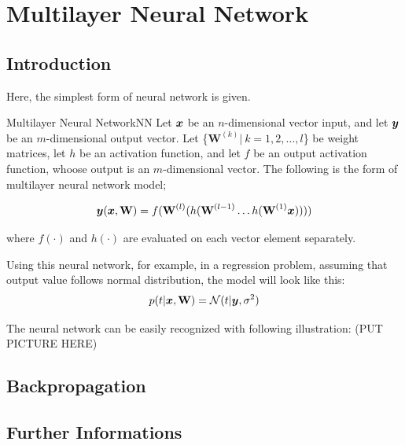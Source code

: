 \documentclass{report}
\begin{document}
    \section{Multilayer Neural Network}
    
        \subsection{Introduction}
        Here, the simplest form of neural network is given.

        \begin{defn}{Multilayer Neural Network}{NN}
            Let $\boldsymbol{x}$ be an $n$-dimensional vector input, and let $\boldsymbol{y}$ be an $m$-dimensional output vector.
            Let \{$\textbf{W}^{(k)}|\ k=1,2,\ldots,l$\} be weight matrices, let $h$ be an activation function,
            and let $f$ be an output activation function, whoose output is an $m$-dimensional vector.
            The following is the form of multilayer neural network model;

            \[
            \boldsymbol{y}(\boldsymbol{x},\textbf{W})=f(\textbf W^{(l)}(h(\textbf W^{(l-1)}\ldots h(\textbf W^{(1)}\boldsymbol{x}))))
            \]

            where $f(\cdot)$ and $h(\cdot)$ are evaluated on each vector element separately.
        
        \end{defn}
        Using this neural network, for example, in a regression problem, assuming that output value follows normal distribution,
        the model will look like this:
        \[
        p(t|\boldsymbol{x}, \textbf{W}) = \mathcal N (t|\boldsymbol{y}, \sigma^2)
        \]

        The neural network  can be easily recognized with following illustration: (PUT PICTURE HERE)

        \subsection{Backpropagation}

        \subsection{Further Informations}
\end{document}
